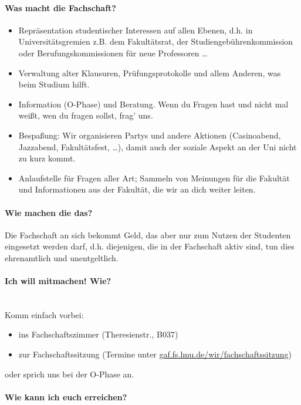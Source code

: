 \documentclass[twoside,12pt,parskip=half-]{scrartcl}
\begin{document}
\paragraph{Was macht die Fachschaft?}
\begin{itemize}
\item Repräsentation studentischer Interessen auf allen Ebenen, d.h. in Universitätsgremien z.B. dem Fakultätsrat, der Studiengebührenkommission oder Berufungskommissionen für neue Professoren \ldots
\item Verwaltung alter Klausuren, Prüfungsprotokolle und allem Anderen, was beim Studium hilft.
\item Information (O-Phase) und Beratung. Wenn du Fragen hast und nicht mal weißt, wen du fragen sollst, frag' uns.
\item Bespaßung: Wir organisieren Partys und andere Aktionen (Casinoabend, Jazzabend, Fakultätsfest, \ldots), damit auch der soziale Aspekt an der Uni nicht zu kurz kommt.
\item Anlaufstelle für Fragen aller Art; Sammeln von Meinungen für die Fakultät und Informationen aus der Fakultät, die wir an dich weiter leiten.
\end{itemize}

\paragraph{Wie machen die das?}
Die Fachschaft an sich bekommt Geld, das aber nur zum Nutzen der
Studenten eingesetzt werden darf, d.h. diejenigen, die in der
Fachschaft aktiv sind, tun dies ehrenamtlich und unentgeltlich.

\clearpage

\paragraph{Ich will mitmachen! Wie?}\label{mitmachen}\hfill\\

Komm einfach vorbei:
\begin{itemize}
	\item ins Fachschaftszimmer (Theresienstr., B037)
	\item zur Fachschaftssitzung (Termine unter \url{gaf.fs.lmu.de/wir/fachschaftssitzung})
\end{itemize}
oder sprich uns bei der O-Phase an.


\paragraph{Wie kann ich euch erreichen?}\label{gafKontakt}\hfill\\[1em]
\end{document}
